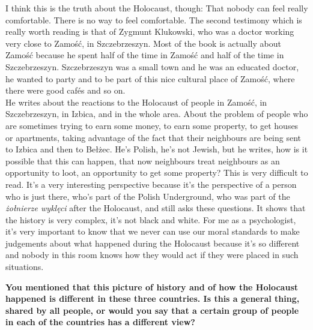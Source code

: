 I think this is the truth about the Holocaust, though: That nobody can feel really comfortable. There is no way to feel comfortable. The second testimony which is really worth reading is that of Zygmunt Klukowski, who was a doctor working very close to Zamość, in Szczebrzeszyn. Most of the book is actually about Zamość because he spent half of the time in Zamość and half of the time in Szczebrzeszyn. Szczebrzeszyn was a small town and he was an educated doctor, he wanted to party and to be part of this nice cultural place of Zamość, where there were good cafés and so on.\\
He writes about the reactions to the Holocaust of people in Zamość, in Szczebrzeszyn, in Izbica, and in the whole area. About the problem of people who are sometimes trying to earn some money, to earn some property, to get houses or apartments, taking advantage of the fact that their neighbours are being sent to Izbica and then to Bełżec. He's Polish, he's not Jewish, but he writes, how is it possible that this can happen, that now neighbours treat neighbours as an opportunity to loot, an opportunity to get some property? This is very difficult to read. It's a very interesting perspective because it's the perspective of a person who is just there, who's part of the Polish Underground, who was part of the \textit{żołnierze wyklęci} after the Holocaust, and still asks these questions. It shows that the history is very complex, it’s not black and white. For me as a psychologist, it’s very important to know that we never can use our moral standards to make judgements about what happened during the Holocaust because it’s so different and nobody in this room knows how they would act if they were placed in such situations.

\textbf{You mentioned that this picture of history and of how the Holocaust happened is different in these three countries. Is this a general thing, shared by all people, or would you say that a certain group of people in each of the countries has a different view?}

